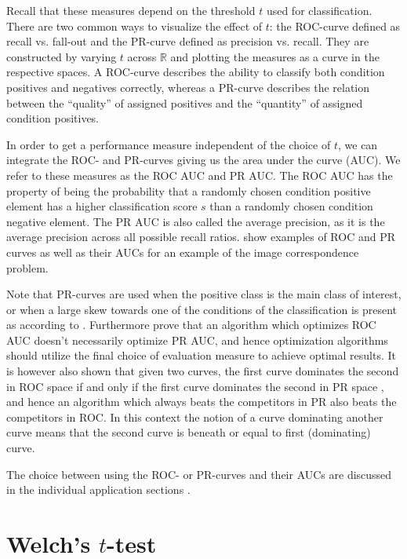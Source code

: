 \documentclass[thesis.tex]{subfiles}
\begin{document}
Recall that these measures depend on the threshold $t$ used for classification. There are two common ways to visualize the effect of $t$: the ROC-curve defined as recall vs. fall-out and the PR-curve defined as precision vs. recall. They are constructed by varying $t$ across $\mathbb{R}$ and plotting the measures as a curve in the respective spaces. A ROC-curve describes the ability to classify both condition positives and negatives correctly, whereas a PR-curve describes the relation between the ``quality'' of assigned positives and the ``quantity'' of assigned condition positives.

In order to get a performance measure independent of the choice of $t$, we can integrate the ROC- and PR-curves giving us the area under the curve (AUC). We refer to these measures as the ROC AUC and PR AUC. The ROC AUC has the property of being the probability that a randomly chosen condition positive element has a higher classification score $s$ than a randomly chosen condition negative element. The PR AUC is also called the average precision, as it is the average precision across all possible recall ratios.  show examples of ROC and PR curves as well as their AUCs for an example of the image correspondence problem.

Note that PR-curves are used when the positive class is the main class of interest, or when a large skew towards one of the conditions of the classification is present as according to \citet{davis2006relationship}. Furthermore \citet{davis2006relationship} prove that an algorithm which optimizes ROC AUC doesn't necessarily optimize PR AUC, and hence optimization algorithms should utilize the final choice of evaluation measure to achieve optimal results. It is however also shown that given two curves, the first curve dominates the second in ROC space if and only if the first curve dominates the second in PR space \cite[Theorem 3.2]{davis2006relationship}, and hence an algorithm which always beats the competitors in PR also beats the competitors in ROC. In this context the notion of a curve dominating another curve means that the second curve is beneath or equal to first (dominating) curve.

The choice between using the ROC- or PR-curves and their AUCs are discussed in the individual application sections .
%
\section{Welch's $t$-test}
\label{sec:welchsTtest}
\end{document}
